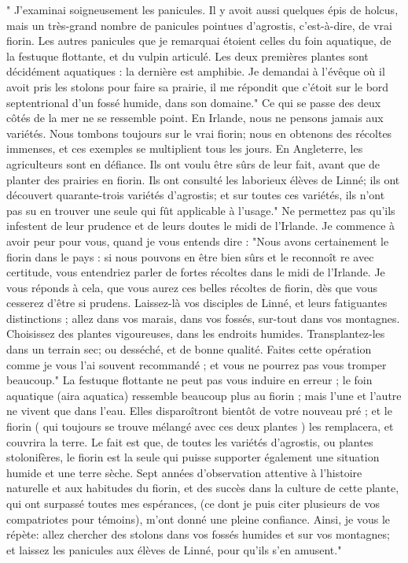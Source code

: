 " J’examinai soigneusement les panicules. Il y avoit aussi quelques épis de holcus, mais un très-grand nombre de panicules\setcounter{page}{253} pointues d'agrostis, c'est-à-dire, de vrai fiorin. Les autres panicules que je remarquai étoient celles du foin aquatique, de la festuque flottante, et du vulpin articulé. Les deux premières plantes sont décidément aquatiques : la dernière est amphibie. Je demandai à l'évêque où il avoit pris les stolons pour faire sa prairie, il me répondit que c'étoit sur le bord septentrional d'un fossé humide, dans son domaine." Ce qui se passe des deux côtés de la mer ne se ressemble point. En Irlande, nous ne pensons jamais aux variétés. Nous tombons toujours sur le vrai fiorin; nous en obtenons des récoltes immenses, et ces exemples se multiplient tous les jours. En Angleterre, les agriculteurs sont en défiance. Ils ont voulu être sûrs de leur fait, avant que de planter des prairies en fiorin. Ils ont consulté les laborieux élèves de Linné; ils ont découvert quarante-trois variétés d'agrostis; et sur toutes ces variétés, ils n'ont pas su en trouver une seule qui fût applicable à l'usage." Ne permettez pas qu'ils infestent de leur prudence et de leurs doutes le midi de l'Irlande. Je commence à avoir peur pour vous, quand je vous entends dire : "Nous avons certainement le fiorin dans le pays : si nous pouvons en être bien sûrs et le reconnoît re\setcounter{page}{254} avec certitude, vous entendriez parler de fortes récoltes dans le midi de l'Irlande. Je vous réponds à cela, que vous aurez ces belles récoltes de fiorin, dès que vous cesserez d'être si prudens. Laissez-là vos disciples de Linné, et leurs fatiguantes distinctions ; allez dans vos marais, dans vos fossés, sur-tout dans vos montagnes. Choisissez des plantes vigoureuses, dans les endroits humides. Transplantez-les dans un terrain sec; ou desséché, et de bonne qualité. Faites cette opération comme je vous l'ai souvent recommandé ; et vous ne pourrez pas vous tromper beaucoup."
La festuque flottante ne peut pas vous induire en erreur ; le foin aquatique (aira aquatica) ressemble beaucoup plus au fiorin ; mais l'une et l'autre ne vivent que dans l'eau. Elles disparoîtront bientôt de votre nouveau pré ; et le fiorin ( qui toujours se trouve mélangé avec ces deux plantes ) les remplacera, et couvrira la terre.
Le fait est que, de toutes les variétés d'agrostis, ou plantes stolonifères, le fiorin est la seule qui puisse supporter également une situation humide et une terre sèche.
Sept années d'observation attentive à l'histoire naturelle et aux habitudes du fiorin, et des succès dans la culture de cette\setcounter{page}{255} plante, qui ont surpassé toutes mes espérances, (ce dont je puis citer plusieurs de vos compatriotes pour témoins), m'ont donné une pleine confiance. Ainsi, je vous le répète: allez chercher des stolons dans vos fossés humides et sur vos montagnes; et laissez les panicules aux élèves de Linné, pour qu'ils s'en amusent."
